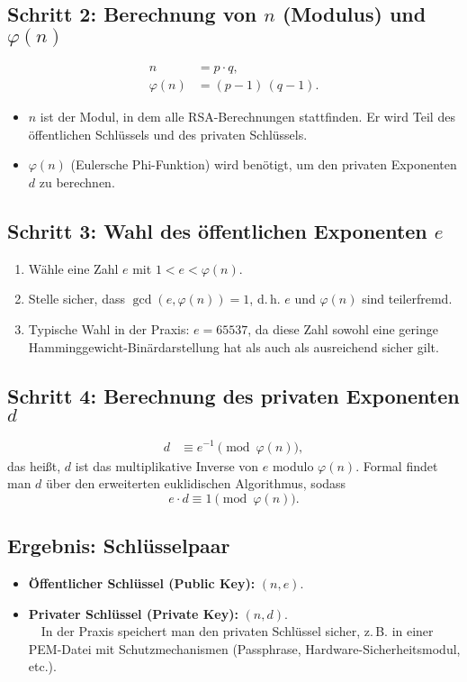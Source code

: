\documentclass[a4paper,11pt]{article}
\begin{document}
\subsection{Schritt 2: Berechnung von \(n\) (Modulus) und \(\varphi(n)\)}
\begin{align*}
  n &= p \cdot q, \\
  \varphi(n) &= (p - 1)\,(q - 1).
\end{align*}
\begin{itemize}
  \item \(n\) ist der Modul, in dem alle RSA-Berechnungen stattfinden. Er wird Teil des öffentlichen Schlüssels und des privaten Schlüssels.
  \item \(\varphi(n)\) (Eulersche Phi-Funktion) wird benötigt, um den privaten Exponenten \(d\) zu berechnen.
\end{itemize}

\subsection{Schritt 3: Wahl des öffentlichen Exponenten \(e\)}
\begin{enumerate}
  \item Wähle eine Zahl \(e\) mit \(1 < e < \varphi(n)\).
  \item Stelle sicher, dass \(\gcd(e, \varphi(n)) = 1\), d.\,h. \(e\) und \(\varphi(n)\) sind teilerfremd.
  \item Typische Wahl in der Praxis: \(e = 65537\), da diese Zahl sowohl eine geringe Hamminggewicht-Binärdarstellung hat als auch als ausreichend sicher gilt.
\end{enumerate}

\subsection{Schritt 4: Berechnung des privaten Exponenten \(d\)}
\begin{align*}
  d &\equiv e^{-1} \pmod{\varphi(n)},
\end{align*}
das heißt, \(d\) ist das multiplikative Inverse von \(e\) modulo \(\varphi(n)\). Formal findet man \(d\) über den erweiterten euklidischen Algorithmus, sodass
\[
  e \cdot d \equiv 1 \pmod{\varphi(n)}.
\]

\subsection{Ergebnis: Schlüsselpaar}
\begin{itemize}
  \item \textbf{Öffentlicher Schlüssel (Public Key):} \((n, e)\).
  \item \textbf{Privater Schlüssel (Private Key):} \((n, d)\).\\
  $\quad$In der Praxis speichert man den privaten Schlüssel sicher, z.\,B. in einer PEM-Datei mit Schutzmechanismen (Passphrase, Hardware-Sicherheitsmodul, etc.).
\end{itemize}
\end{document}
